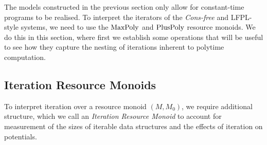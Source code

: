 \documentclass[acmsmall,screen]{acmart}
\begin{document}
The models constructed in the previous section only allow for
constant-time programs to be realised. To interpret the iterators of
the \emph{Cons-free} and LFPL-style systems, we need to use the
$\mathrm{MaxPoly}$ and $\mathrm{PlusPoly}$ resource monoids. We do this in this
section, where first we establish some operations that will be useful
to see how they capture the nesting of iterations inherent to polytime
computation.

\subsection{Iteration Resource Monoids}

To interpret iteration over a resource monoid $(M, M_0)$, we require
additional structure, which we call an \emph{Iteration Resource
  Monoid} to account for measurement of the sizes of iterable data
structures and the effects of iteration on potentials.
\end{document}
